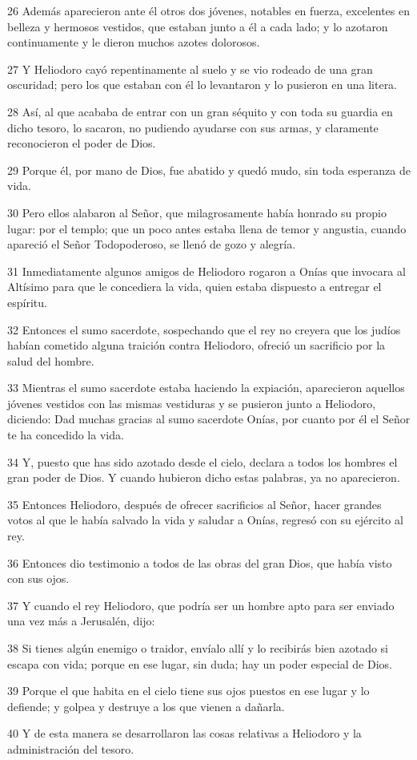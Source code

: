 \par 26 Además aparecieron ante él otros dos jóvenes, notables en fuerza, excelentes en belleza y hermosos vestidos, que estaban junto a él a cada lado; y lo azotaron continuamente y le dieron muchos azotes dolorosos.
\par 27 Y Heliodoro cayó repentinamente al suelo y se vio rodeado de una gran oscuridad; pero los que estaban con él lo levantaron y lo pusieron en una litera.
\par 28 Así, al que acababa de entrar con un gran séquito y con toda su guardia en dicho tesoro, lo sacaron, no pudiendo ayudarse con sus armas, y claramente reconocieron el poder de Dios.
\par 29 Porque él, por mano de Dios, fue abatido y quedó mudo, sin toda esperanza de vida.
\par 30 Pero ellos alabaron al Señor, que milagrosamente había honrado su propio lugar: por el templo; que un poco antes estaba llena de temor y angustia, cuando apareció el Señor Todopoderoso, se llenó de gozo y alegría.
\par 31 Inmediatamente algunos amigos de Heliodoro rogaron a Onías que invocara al Altísimo para que le concediera la vida, quien estaba dispuesto a entregar el espíritu.
\par 32 Entonces el sumo sacerdote, sospechando que el rey no creyera que los judíos habían cometido alguna traición contra Heliodoro, ofreció un sacrificio por la salud del hombre.
\par 33 Mientras el sumo sacerdote estaba haciendo la expiación, aparecieron aquellos jóvenes vestidos con las mismas vestiduras y se pusieron junto a Heliodoro, diciendo: Dad muchas gracias al sumo sacerdote Onías, por cuanto por él el Señor te ha concedido la vida.
\par 34 Y, puesto que has sido azotado desde el cielo, declara a todos los hombres el gran poder de Dios. Y cuando hubieron dicho estas palabras, ya no aparecieron.
\par 35 Entonces Heliodoro, después de ofrecer sacrificios al Señor, hacer grandes votos al que le había salvado la vida y saludar a Onías, regresó con su ejército al rey.
\par 36 Entonces dio testimonio a todos de las obras del gran Dios, que había visto con sus ojos.
\par 37 Y cuando el rey Heliodoro, que podría ser un hombre apto para ser enviado una vez más a Jerusalén, dijo:
\par 38 Si tienes algún enemigo o traidor, envíalo allí y lo recibirás bien azotado si escapa con vida; porque en ese lugar, sin duda; hay un poder especial de Dios.
\par 39 Porque el que habita en el cielo tiene sus ojos puestos en ese lugar y lo defiende; y golpea y destruye a los que vienen a dañarla.
\par 40 Y de esta manera se desarrollaron las cosas relativas a Heliodoro y la administración del tesoro.

